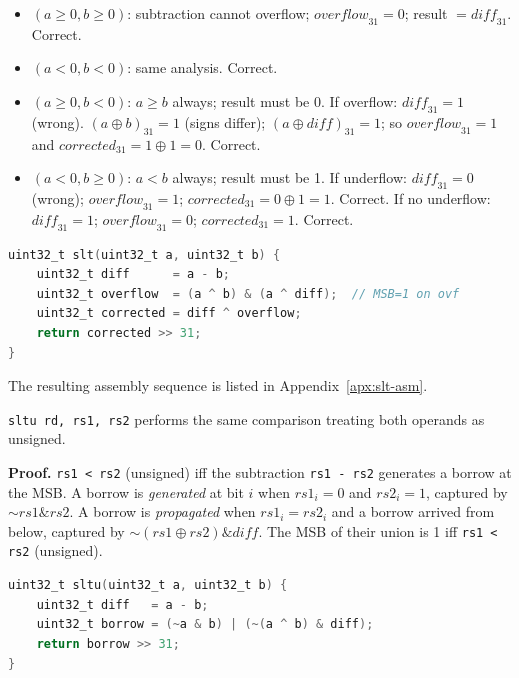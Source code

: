 \begin{itemize}
  \item $(a \geq 0, b \geq 0)$: subtraction cannot overflow; $\mathit{overflow}_{31} = 0$; result
        $= \mathit{diff}_{31}$. Correct.
  \item $(a < 0, b < 0)$: same analysis. Correct.
  \item $(a \geq 0, b < 0)$: $a \geq b$ always; result must be 0. If overflow:
        $\mathit{diff}_{31} = 1$ (wrong). $(a \oplus b)_{31} = 1$ (signs differ); $(a \oplus
        \mathit{diff})_{31} = 1$; so $\mathit{overflow}_{31} = 1$ and
        $\mathit{corrected}_{31} = 1 \oplus 1 = 0$. Correct.
  \item $(a < 0, b \geq 0)$: $a < b$ always; result must be 1. If underflow:
        $\mathit{diff}_{31} = 0$ (wrong); $\mathit{overflow}_{31} = 1$;
        $\mathit{corrected}_{31} = 0 \oplus 1 = 1$. Correct. If no underflow:
        $\mathit{diff}_{31} = 1$; $\mathit{overflow}_{31} = 0$;
        $\mathit{corrected}_{31} = 1$. Correct.
\end{itemize}

\begin{lstlisting}[language=C]
uint32_t slt(uint32_t a, uint32_t b) {
    uint32_t diff      = a - b;
    uint32_t overflow  = (a ^ b) & (a ^ diff);  // MSB=1 on ovf
    uint32_t corrected = diff ^ overflow;
    return corrected >> 31;
}
\end{lstlisting}

The resulting assembly sequence is listed in Appendix~\ref{apx:slt-asm}.

\texttt{sltu rd, rs1, rs2} performs the same comparison treating both operands as unsigned.

\textbf{Proof.} \texttt{rs1 < rs2} (unsigned) iff the subtraction \texttt{rs1 - rs2} generates a
borrow at the MSB. A borrow is \textit{generated} at bit $i$ when $\mathit{rs1}_i = 0$ and
$\mathit{rs2}_i = 1$, captured by $\mathord{\sim}\mathit{rs1} \mathbin{\&} \mathit{rs2}$. A borrow
is \textit{propagated} when $\mathit{rs1}_i = \mathit{rs2}_i$ and a borrow arrived from below,
captured by $\mathord{\sim}(\mathit{rs1} \oplus \mathit{rs2}) \mathbin{\&} \mathit{diff}$. The MSB
of their union is 1 iff \texttt{rs1 < rs2} (unsigned).

\begin{lstlisting}[language=C]
uint32_t sltu(uint32_t a, uint32_t b) {
    uint32_t diff   = a - b;
    uint32_t borrow = (~a & b) | (~(a ^ b) & diff);
    return borrow >> 31;
}
\end{lstlisting}

